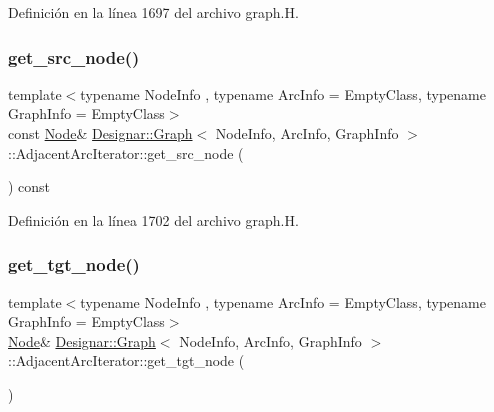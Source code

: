 Definición en la línea 1697 del archivo graph.\+H.

\mbox{\label{class_designar_1_1_graph_1_1_adjacent_arc_iterator_ae4ba07319b439cc08df6c957a61bc224}} 
\subsubsection{\texorpdfstring{get\+\_\+src\+\_\+node()}{get\_src\_node()}\hspace{0.1cm}{\footnotesize\ttfamily [2/2]}}
{\footnotesize\ttfamily template$<$typename Node\+Info , typename Arc\+Info  = Empty\+Class, typename Graph\+Info  = Empty\+Class$>$ \\
const \hyperlink{class_designar_1_1_graph_a5dfc7dba9d092ac489c72e40390c37d0}{Node}\& \hyperlink{class_designar_1_1_graph}{Designar\+::\+Graph}$<$ Node\+Info, Arc\+Info, Graph\+Info $>$\+::Adjacent\+Arc\+Iterator\+::get\+\_\+src\+\_\+node (\begin{DoxyParamCaption}{ }\end{DoxyParamCaption}) const\hspace{0.3cm}{\ttfamily [inline]}}



Definición en la línea 1702 del archivo graph.\+H.

\mbox{\label{class_designar_1_1_graph_1_1_adjacent_arc_iterator_a400e7399fa39eb49e64afcd2d0b26ff6}} 
\subsubsection{\texorpdfstring{get\+\_\+tgt\+\_\+node()}{get\_tgt\_node()}\hspace{0.1cm}{\footnotesize\ttfamily [1/2]}}
{\footnotesize\ttfamily template$<$typename Node\+Info , typename Arc\+Info  = Empty\+Class, typename Graph\+Info  = Empty\+Class$>$ \\
\hyperlink{class_designar_1_1_graph_a5dfc7dba9d092ac489c72e40390c37d0}{Node}\& \hyperlink{class_designar_1_1_graph}{Designar\+::\+Graph}$<$ Node\+Info, Arc\+Info, Graph\+Info $>$\+::Adjacent\+Arc\+Iterator\+::get\+\_\+tgt\+\_\+node (\begin{DoxyParamCaption}{ }\end{DoxyParamCaption})\hspace{0.3cm}{\ttfamily [inline]}}




